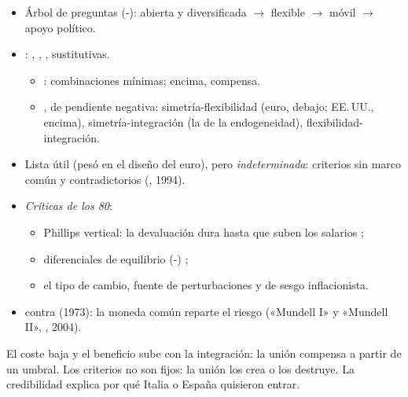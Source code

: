 \documentclass{article}
\begin{document}
\begin{columnas}
\begin{itemize}
\item Árbol de preguntas (-): abierta y diversificada $\to$ flexible $\to$ móvil $\to$ apoyo político.
\item {}: , , , sustitutivas.
  \begin{itemize}
  \item {}: combinaciones mínimas; encima, compensa.
  \item {}, de pendiente negativa: simetría-flexibilidad (euro, debajo; EE.\,UU., encima), simetría-integración (la de la endogeneidad), flexibilidad-integración.
  \end{itemize}
\end{itemize}

\begin{itemize}
\item Lista útil (pesó en el diseño del euro), pero \emph{indeterminada}: criterios sin marco común y contradictorios (, 1994).
\item \emph{Críticas de los 80}:
  \begin{itemize}
  \item Phillips vertical: la devaluación dura hasta que suben los salarios ;
  \item diferenciales de equilibrio (-) ;
  \item el tipo de cambio, fuente de perturbaciones y de sesgo inflacionista.
  \end{itemize}
\item {} contra  (1973): la moneda común reparte el riesgo («Mundell I» y «Mundell II», , 2004).
\end{itemize}

\begin{ideaclave}
El coste baja y el beneficio sube con la integración: la unión compensa a partir de un umbral. Los criterios no son fijos: la unión los crea o los destruye. La credibilidad explica por qué Italia o España quisieron entrar.
\end{ideaclave}


\end{columnas}
\end{document}
